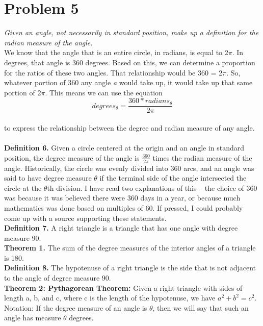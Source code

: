 \documentclass[11pt]{article} %
\newcommand\tab[1][1cm]{\hspace*{#1}}
\begin{document}
\section{Problem 5}
\textit{Given an angle, not necessarily in standard position, make up a definition for
the radian measure of the angle.}
\\
We know that the angle that is an entire circle, in radians, is equal to 2$\pi$. In degrees, that angle is 360 degrees. 
Based on this, we can determine a proportion for the ratios of these two angles. That relationship would be 360 = 2$\pi$. 
So, whatever portion of 360 any angle \textit{a} would take up, it would take up that same portion of 2$\pi$. 
This means we can use the equation \\ 
\begin{displaymath} degrees_\theta = \frac{360*radians_\theta}{2\pi} \end{displaymath} 
\\ to express the relationship between the degree and radian measure of any angle.\\
\\
\tab \textbf{Definition 6.} Given a circle centered at the origin and an angle in standard position, the
degree measure of the angle is $\frac{360}{2\pi}$ times the radian measure of the angle.
Historically, the circle was evenly divided into 360 arcs, and an angle was said to have
degree measure $\theta$ if the terminal side of the angle intersected the circle at the $\theta$th division.
I have read two explanations of this – the choice of 360 was because it was believed there
were 360 days in a year, or because much mathematics was done based on multiples of 60.
If pressed, I could probably come up with a source supporting these statements.
\\
\tab \textbf{Definition 7.} A right triangle is a triangle that has one angle with degree measure 90.
\\
\tab \textbf{Theorem 1.} The sum of the degree measures of the interior angles of a triangle is 180.
\\
\tab \textbf{Definition 8.} The hypotenuse of a right triangle is the side that is not adjacent to the angle
of degree measure 90.
\\
\tab \textbf{Theorem 2: Pythagorean Theorem:} Given a right triangle with sides of length a, b, and
c, where c is the length of the hypotenuse, we have $a^2 +b^2 = c^2$.
Notation: If the degree measure of an angle is $\theta$, then we will say that such an angle has
measure $\theta$ degrees.
\end{document}

